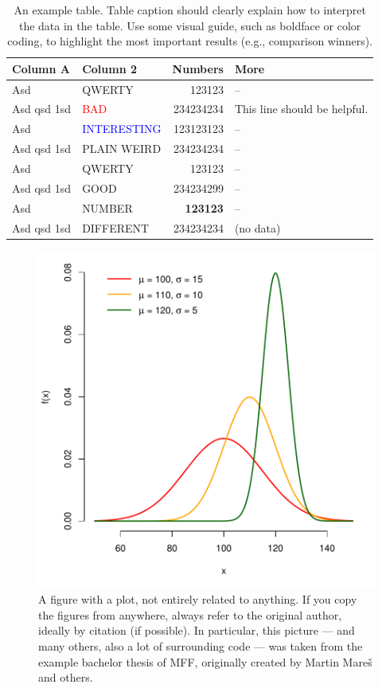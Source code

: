 \begin{table}
\centering
{\footnotesize\sf
\begin{tabular}{llrl}
\toprule
Column A & Column 2 & Numbers & More \\
\midrule
Asd & QWERTY & 123123 & -- \\
Asd qsd 1sd & \textcolor{red}{BAD} & 234234234 & This line should be helpful. \\
Asd & \textcolor{blue}{INTERESTING} & 123123123 & -- \\
Asd qsd 1sd & \textcolor{violet!50}{PLAIN WEIRD} & 234234234 & -- \\
Asd & QWERTY & 123123 & -- \\
\addlinespace %
Asd qsd 1sd & \textcolor{green!80!black}{GOOD} & 234234299 & -- \\
Asd & NUMBER & \textbf{123123} & -- \\
Asd qsd 1sd & DIFFERENT & 234234234 & (no data) \\
\bottomrule
\end{tabular}}
\caption{An example table. Table caption should clearly explain how to interpret the data in the table. Use some visual guide, such as boldface or color coding, to highlight the most important results (e.g., comparison winners).}
\label{tab:z}
\end{table}

\begin{figure}
\centering
\includegraphics[width=.6\linewidth]{img/ukazka-obr02.pdf}
\caption{A figure with a plot, not entirely related to anything. If you copy the figures from anywhere, always refer to the original author, ideally by citation (if possible). In particular, this picture --- and many others, also a lot of surrounding code --- was taken from the example bachelor thesis of MFF, originally created by Martin Mareš and others.}
\label{fig:g}
\end{figure}

